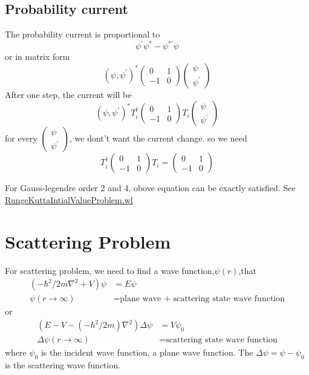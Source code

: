 \documentclass[12pt,twoside]{article}
\begin{document}
\subsection{Probability current}
The probability current is proportional to
$$
\psi^\prime\psi^*-\psi^{*\prime}\psi
$$
or in matrix form
$$
(\psi,\psi^\prime)^* \begin{pmatrix} 0 & 1 \\ -1 & 0\end{pmatrix}  \begin{pmatrix} \psi \\ \psi^\prime \end{pmatrix}
$$
After one step, the current will be
$$
(\psi,\psi^\prime)^* T_i^\dagger\begin{pmatrix} 0 & 1 \\ -1 & 0\end{pmatrix}  T_i \begin{pmatrix} \psi \\ \psi^\prime \end{pmatrix}
$$
for every $\begin{pmatrix} \psi \\ \psi^\prime \end{pmatrix}$, we dont't want the current change. so we need
$$
T_i^\dagger\begin{pmatrix} 0 & 1 \\ -1 & 0\end{pmatrix}  T_i = \begin{pmatrix} 0 & 1 \\ -1 & 0\end{pmatrix}
$$

For Gauss-legendre order 2 and 4, obove equation can be exactly satisfied. See \url{RungeKuttaIntialValueProblem.wl}

\section{Scattering Problem}

For scattering problem, we need to find a wave function,$\psi(r)$,that
\begin{align*}
(-\hbar^2/2m\nabla^2 + V)\psi &= E \psi\\
\psi(r\rightarrow\infty) &= \text{plane wave + scattering state wave function}
\end{align*}
or
\begin{align}\label{eq:scattering}
(E - V -(-\hbar^2/2m)\nabla^2)\Delta\psi &= V\psi_0\\ \label{eq:scattering_boundary}
\Delta\psi(r\rightarrow\infty) &= \text{scattering state wave function}
\end{align}
where $\psi_0$ is the incident wave function, a plane wave function.
The $\Delta \psi = \psi - \psi_0$ is the scattering wave function.
\end{document}
